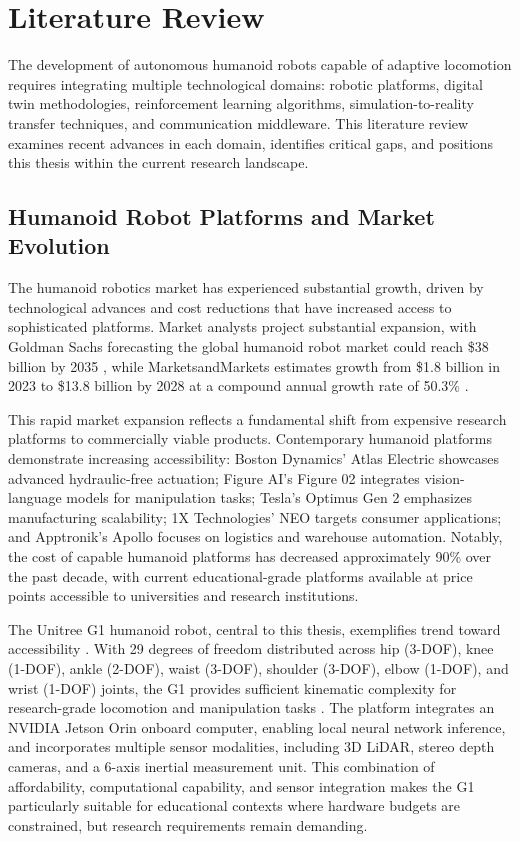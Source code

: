 \documentclass[12pt,a4paper]{article}
\begin{document}
\newpage

\section{Literature Review}

The development of autonomous humanoid robots capable of adaptive locomotion requires integrating multiple technological domains: robotic platforms, digital twin methodologies, reinforcement learning algorithms, simulation-to-reality transfer techniques, and communication middleware. This literature review examines recent advances in each domain, identifies critical gaps, and positions this thesis within the current research landscape.

\subsection{Humanoid Robot Platforms and Market Evolution}

The humanoid robotics market has experienced substantial growth, driven by technological advances and cost reductions that have increased access to sophisticated platforms. Market analysts project substantial expansion, with Goldman Sachs forecasting the global humanoid robot market could reach \$38 billion by 2035 \parencite{goldmansachs2024humanoid}, while MarketsandMarkets estimates growth from \$1.8 billion in 2023 to \$13.8 billion by 2028 at a compound annual growth rate of 50.3\% \parencite{marketsandmarkets2024}.

This rapid market expansion reflects a fundamental shift from expensive research platforms to commercially viable products. Contemporary humanoid platforms demonstrate increasing accessibility: Boston Dynamics' Atlas Electric showcases advanced hydraulic-free actuation; Figure AI's Figure 02 integrates vision-language models for manipulation tasks; Tesla's Optimus Gen 2 emphasizes manufacturing scalability; 1X Technologies' NEO targets consumer applications; and Apptronik's Apollo focuses on logistics and warehouse automation. Notably, the cost of capable humanoid platforms has decreased approximately 90\% over the past decade, with current educational-grade platforms available at price points accessible to universities and research institutions.

The Unitree G1 humanoid robot, central to this thesis, exemplifies trend toward accessibility . With 29 degrees of freedom distributed across hip (3-DOF), knee (1-DOF), ankle (2-DOF), waist (3-DOF), shoulder (3-DOF), elbow (1-DOF), and wrist (1-DOF) joints, the G1 provides sufficient kinematic complexity for research-grade locomotion and manipulation tasks \parencite{unitree2024}. The platform integrates an NVIDIA Jetson Orin onboard computer, enabling local neural network inference, and incorporates multiple sensor modalities, including 3D LiDAR, stereo depth cameras, and a 6-axis inertial measurement unit. This combination of affordability, computational capability, and sensor integration makes the G1 particularly suitable for educational contexts where hardware budgets are constrained, but research requirements remain demanding.
\end{document}
